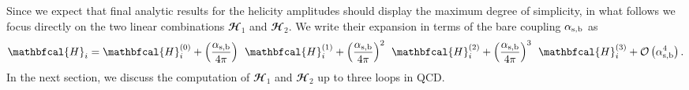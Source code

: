 Since we expect that final analytic results for the 
helicity amplitudes should display the maximum degree of simplicity,
in what follows we focus directly on the two 
linear combinations $\mathbfcal{H}_1$ and $\mathbfcal{H}_2$.
We write their expansion in terms of the bare coupling $\alpha_\mathrm{s,b}$ as
\begin{equation}\label{full_amplitude}
\mathbfcal{H}_i =  \mathbfcal{H}^{(0)}_i +\left(  \frac{\asb }{4 \pi}  \right)\: \:\mathbfcal{H}^{(1)}_i+\left(  \frac{\asb }{4 \pi}  \right)^2\:  \: \mathbfcal{H}^{(2)}_i+\left( \frac{\asb }{4 \pi}  \right)^3 \:  \:\mathbfcal{H}^{(3)}_i + \calO\left( \asb^4 \right).
\end{equation} 
In the next section, we discuss the computation of  $\mathbfcal{H}_1$ and $\mathbfcal{H}_2$ up to three loops in QCD.
